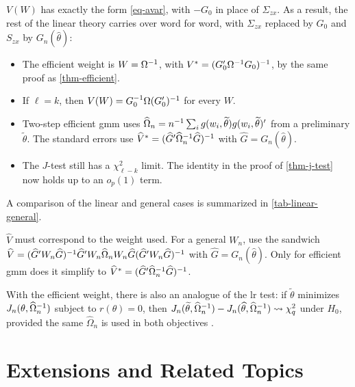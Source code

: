 \documentclass[a4paper,12pt]{article}
\begin{document}
\begin{remark}
	$V(W)$ has exactly the form \eqref{eq-avar}, with $-G_0$ in place of $\Sigma_{zx}$.
	As a result, the rest of the linear theory carries over word for word, with $\Sigma_{zx}$ replaced by $G_0$ and $S_{zx}$ by $G_n(\widehat\theta)$:
	\begin{itemize}
		\item The efficient weight is $W=\Omega^{-1}$, with $V^*=(G_0^{\prime}\Omega^{-1} G_0)^{-1}$, by the same proof as \autoref{thm-efficient}.
		\item If $\ell=k$, then $V(W)=G_0^{-1}\Omega(G_0^{\prime})^{-1}$ for every $W$.
		\item Two-step efficient \gls{gmm} uses $\widehat\Omega_n=n^{-1}\sum_ig(w_i,\widetilde\theta)g(w_i,\widetilde\theta)^{\prime}$ from a preliminary $\widetilde\theta$.
			The standard errors use $\widehat V^*=(\widehat G^{\prime}\widehat\Omega_n^{-1}\widehat G)^{-1}$ with $\widehat G=G_n(\widehat\theta)$.
		\item The $J$-test still has a $\chi^2_{\ell-k}$ limit. The identity in the proof of \autoref{thm-j-test} now holds up to an $o_p(1)$ term.
	\end{itemize}
	A comparison of the linear and general cases is summarized in \autoref{tab-linear-general}.
\end{remark}

\begin{remark}
	$\widehat V$ must correspond to the weight used.
	For a general $W_n$, use the sandwich $\widehat V=(\widehat G^{\prime} W_n\widehat G)^{-1}\widehat G^{\prime} W_n\widehat\Omega_nW_n\widehat G(\widehat G^{\prime} W_n\widehat G)^{-1}$ with $\widehat G=G_n(\widehat\theta)$.
	Only for efficient \gls{gmm} does it simplify to $\widehat V^*=(\widehat G^{\prime}\widehat\Omega_n^{-1}\widehat G)^{-1}$.
\end{remark}

\begin{remark}
	With the efficient weight, there is also an analogue of the \gls{lr} test:
	if $\widetilde\theta$ minimizes $J_n(\theta,\widehat\Omega_n^{-1})$ subject to $r(\theta)=0$, then
	$J_n(\widetilde\theta,\widehat\Omega_n^{-1})-J_n(\widehat\theta,\widehat\Omega_n^{-1})\overset{}{\leadsto}\chi^2_q$ under $H_0$,
	provided the same $\widehat\Omega_n$ is used in both objectives \parencite[Chapter 3]{hayashi-2000}.
\end{remark}

\section{Extensions and Related Topics}
\end{document}

